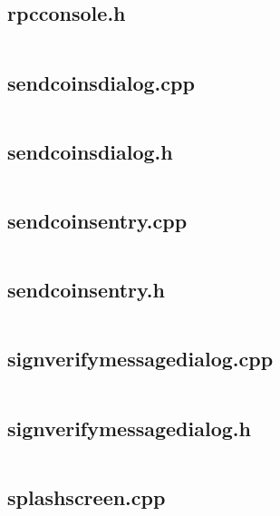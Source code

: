 \documentclass{article}
\begin{document}
\subsection{rpcconsole.h}
\inputminted{cpp}{/home/dufferzafar/dev/@clones/bitcoin/src/qt/rpcconsole.h}
\newpage

\subsection{sendcoinsdialog.cpp}
\inputminted{cpp}{/home/dufferzafar/dev/@clones/bitcoin/src/qt/sendcoinsdialog.cpp}
\newpage

\subsection{sendcoinsdialog.h}
\inputminted{cpp}{/home/dufferzafar/dev/@clones/bitcoin/src/qt/sendcoinsdialog.h}
\newpage

\subsection{sendcoinsentry.cpp}
\inputminted{cpp}{/home/dufferzafar/dev/@clones/bitcoin/src/qt/sendcoinsentry.cpp}
\newpage

\subsection{sendcoinsentry.h}
\inputminted{cpp}{/home/dufferzafar/dev/@clones/bitcoin/src/qt/sendcoinsentry.h}
\newpage

\subsection{signverifymessagedialog.cpp}
\inputminted{cpp}{/home/dufferzafar/dev/@clones/bitcoin/src/qt/signverifymessagedialog.cpp}
\newpage

\subsection{signverifymessagedialog.h}
\inputminted{cpp}{/home/dufferzafar/dev/@clones/bitcoin/src/qt/signverifymessagedialog.h}
\newpage

\subsection{splashscreen.cpp}
\inputminted{cpp}{/home/dufferzafar/dev/@clones/bitcoin/src/qt/splashscreen.cpp}
\newpage
\end{document}
